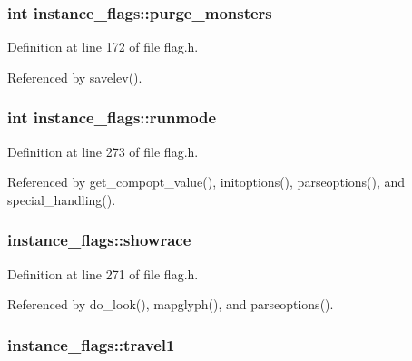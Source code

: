 \hypertarget{structinstance__flags_a246e9f136457484fe45ef20ecb85dc67}{
\subsubsection[{purge\+\_\+monsters}]{\setlength{\rightskip}{0pt plus 5cm}int instance\+\_\+flags\+::purge\+\_\+monsters}}\label{structinstance__flags_a246e9f136457484fe45ef20ecb85dc67}


Definition at line 172 of file flag.\+h.



Referenced by savelev().

\hypertarget{structinstance__flags_a395895542513cb9177e88f330ba18575}{
\subsubsection[{runmode}]{\setlength{\rightskip}{0pt plus 5cm}int instance\+\_\+flags\+::runmode}}\label{structinstance__flags_a395895542513cb9177e88f330ba18575}


Definition at line 273 of file flag.\+h.



Referenced by get\+\_\+compopt\+\_\+value(), initoptions(), parseoptions(), and special\+\_\+handling().

\hypertarget{structinstance__flags_ab12d17fe0bcca460f333ef2b29f1d249}{
\subsubsection[{showrace}]{ instance\+\_\+flags\+::showrace}}\label{structinstance__flags_ab12d17fe0bcca460f333ef2b29f1d249}


Definition at line 271 of file flag.\+h.



Referenced by do\+\_\+look(), mapglyph(), and parseoptions().

\hypertarget{structinstance__flags_a187dde7a0cca841a0ca6fd7d677dd5ae}{
\subsubsection[{travel1}]{ instance\+\_\+flags\+::travel1}}\label{structinstance__flags_a187dde7a0cca841a0ca6fd7d677dd5ae}


